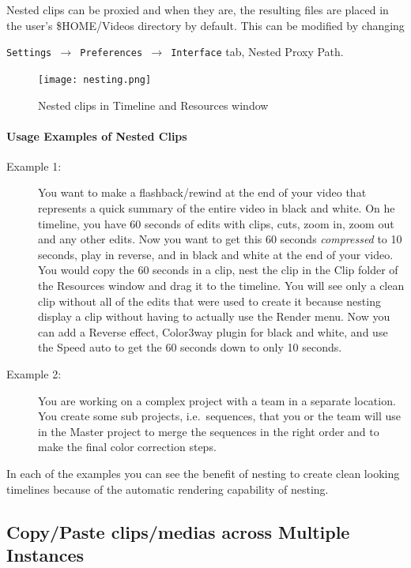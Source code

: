 Nested clips can be proxied and when they are, the resulting files
are placed in the user's \$HOME/Videos directory by default.  This
can be modified by changing

\texttt{Settings $\rightarrow$ Preferences $\rightarrow$ Interface}
tab, Nested Proxy Path.

\begin{figure}[htpb]
  \centering
  \texttt{[image: nesting.png]}
  \caption{Nested clips in Timeline and Resources window}
  \label{fig:nesting}
\end{figure}

\paragraph{Usage Examples of Nested Clips}

\begin{description}
\item[Example 1:] You want to make a flashback/rewind at the end
  of your video that represents a quick summary of the entire video in
  black and white. On he timeline, you have 60 seconds of edits with
  clips, cuts, zoom in, zoom out and any other edits. Now you want to
  get this 60 seconds \textit{compressed} to 10 seconds, play in
  reverse, and in black and white at the end of your video.  You would
  copy the 60 seconds in a clip, nest the clip in the Clip folder of
  the Resources window and drag it to the timeline. You will see only
  a clean clip without all of the edits that were used to create it
  because nesting display a clip without having to actually use the
  Render menu.  Now you can add a Reverse effect, Color3way plugin for
  black and white, and use the Speed auto to get the 60 seconds down
  to only 10 seconds.
\item[Example 2:] You are working on a complex project with a
  team in a separate location. You create some sub projects, i.e.\
  sequences, that you or the team will use in the Master project to
  merge the sequences in the right order and to make the final color
  correction steps.
\end{description}

In each of the examples you can see the benefit of nesting to create
clean looking timelines because of the automatic rendering
capability of nesting.


\subsection{Copy/Paste clips/medias across Multiple Instances}%
\label{sub:copy_paste_multiple_instances}

